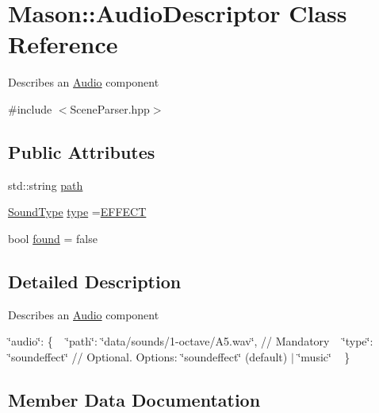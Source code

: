 \hypertarget{class_mason_1_1_audio_descriptor}{}\section{Mason\+:\+:Audio\+Descriptor Class Reference}
\label{class_mason_1_1_audio_descriptor}


Describes an \hyperlink{class_mason_1_1_audio}{Audio} component ~\newline
  




{\ttfamily \#include $<$Scene\+Parser.\+hpp$>$}

\subsection*{Public Attributes}
\begin{DoxyCompactItemize}
\item 
std\+::string \hyperlink{class_mason_1_1_audio_descriptor_a48908da92ad467deffccb4d8340aea20}{path}
\item 
\hyperlink{namespace_mason_a158d651086d1ba1aacc4c37125b27657}{Sound\+Type} \hyperlink{class_mason_1_1_audio_descriptor_af0235fd20741197930246f28acb5113b}{type} =\hyperlink{namespace_mason_a158d651086d1ba1aacc4c37125b27657a3ee843ce73fc06de504eb1480c65c82f}{E\+F\+F\+E\+CT}
\item 
bool \hyperlink{class_mason_1_1_audio_descriptor_ab49d1cfecfbd13d161f1bad522bd3294}{found} = false
\end{DoxyCompactItemize}


\subsection{Detailed Description}
Describes an \hyperlink{class_mason_1_1_audio}{Audio} component ~\newline
 

\char`\"{}audio\char`\"{}\+: \{ ~\newline
 \char`\"{}path\char`\"{}\+: \char`\"{}data/sounds/1-\/octave/\+A5.\+wav\char`\"{}, // Mandatory ~\newline
 \char`\"{}type\char`\"{}\+: \char`\"{}soundeffect\char`\"{} // Optional. Options\+: \char`\"{}soundeffect\char`\"{} (default) $\vert$ \char`\"{}music\char`\"{} ~\newline
 \} 

\subsection{Member Data Documentation}
\hypertarget{class_mason_1_1_audio_descriptor_ab49d1cfecfbd13d161f1bad522bd3294}{}\label{class_mason_1_1_audio_descriptor_ab49d1cfecfbd13d161f1bad522bd3294} 

